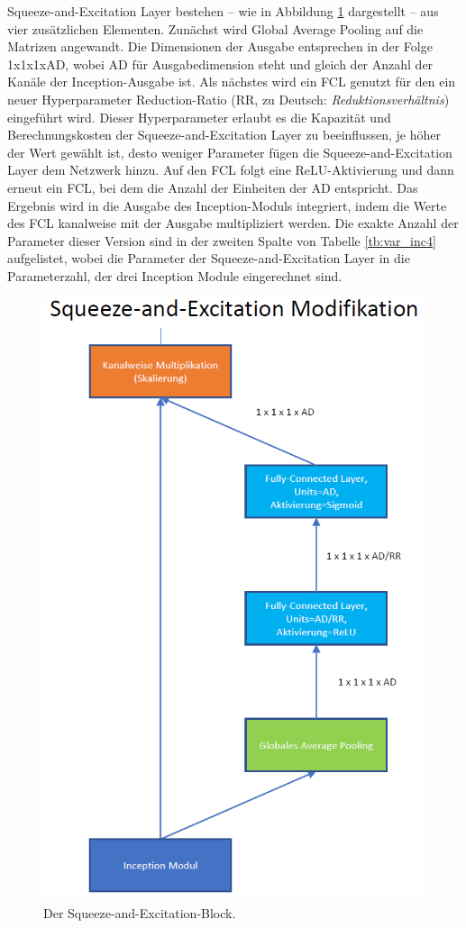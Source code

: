 Squeeze-and-Excitation Layer bestehen -- wie in Abbildung \ref{fig:sae} dargestellt -- aus vier zusätzlichen Elementen. Zunächst wird Global Average Pooling auf die Matrizen angewandt. Die Dimensionen der Ausgabe entsprechen in der Folge 1x1x1xAD, wobei AD für Ausgabedimension steht und gleich der Anzahl der Kanäle der Inception-Ausgabe ist. Als nächstes wird ein FCL genutzt für den ein neuer Hyperparameter Reduction-Ratio (RR, zu Deutsch: \textit{Reduktionsverhältnis}) eingeführt wird. Dieser Hyperparameter erlaubt es die Kapazität und Berechnungskosten der Squeeze-and-Excitation Layer zu beeinflussen, je höher der Wert gewählt ist, desto weniger Parameter fügen die Squeeze-and-Excitation Layer dem Netzwerk hinzu. Auf den FCL folgt eine ReLU-Aktivierung und dann erneut ein FCL, bei dem die Anzahl der Einheiten der AD entspricht. Das Ergebnis wird in die Ausgabe des Inception-Moduls integriert, indem die Werte des FCL kanalweise mit der Ausgabe multipliziert werden.  Die exakte Anzahl der Parameter dieser Version sind in der zweiten Spalte von Tabelle \ref{tb:var_inc4} aufgelistet, wobei die Parameter der Squeeze-and-Excitation Layer in die Parameterzahl, der drei Inception Module eingerechnet sind.

\newpage
\begin{figure}[H]
\centering
\thispagestyle{empty}
\includegraphics[scale=0.75]{pictures/Inception/SqueezeAndExcitation}
\caption[Caption for LOF]{Der Squeeze-and-Excitation-Block.}
\label{fig:sae}
\end{figure}
